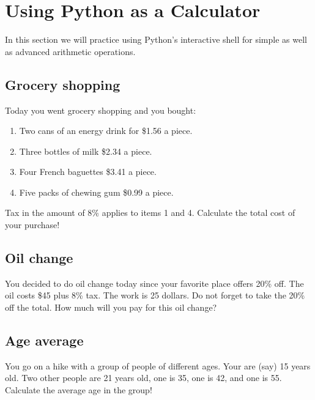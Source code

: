 
\section{Using Python as a Calculator}

In this section we will practice using Python's interactive shell for simple 
as well as advanced arithmetic operations.


\subsection{Grocery shopping}

Today you went grocery shopping and you bought:
\begin{enumerate}
\item Two cans of an energy drink for \$1.56 a piece.
\item Three bottles of milk \$2.34 a piece.
\item Four French baguettes \$3.41 a piece.
\item Five packs of chewing gum \$0.99 a piece.
\end{enumerate}
Tax in the amount of 8\% applies to items 1 and 4.
Calculate the total cost of your purchase!


\subsection{Oil change}

You decided to do oil change today since your favorite 
place offers 20\% off. The oil costs \$45 plus 8\% tax. 
The work is 25 dollars. Do not forget to take the 20\% off the 
total. How much will you pay for this oil change? 


\subsection{Age average}

You go on a hike with a group of people of different 
ages. Your are (say) 15 years old. Two other people 
are 21 years old, one is 35, one is 42, and one is 55.
Calculate the average age in the group!

